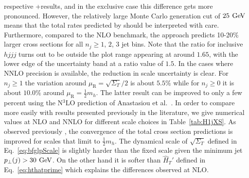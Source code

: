 respective \hjetscompGoSam{}+\hjetscompSherpa results, and in the exclusive case this
difference gets more pronounced. However, the relatively large Monte
Carlo generation cut of $25\,\text{\:GeV}$ means that the total rates predicted
by \hjetscompLoopsim should be interpreted with care.
Furthermore, compared to the NLO benchmark, the \hjetscompMinlo approach
predicts 10-20\% larger cross sections for all $n_j\ge 1$, $2$, $3$ jet bins.
Note that the \hjetscompMinlo ratio for inclusive $hjjj$ turns out to be
outside the plot range appearing at around $1.65$, with the lower edge
of the uncertainty band at a ratio value of $1.5$.
In the cases where NNLO precision is available, the reduction in scale
uncertainty is clear. For $n_j\ge1$ the variation around
$\mu_\mathrm{R}=\sqrt{\Sigma_T}/2$ is about $5.5\%$ while for
$n_j\ge0$ it is about $10.0\%$ around $\mu_\mathrm{R}=\tfrac{1}{2}m_h$.
The latter result can be improved to only a few percent using the
N${}^3$LO prediction of Anastasiou et al.~\cite{Anastasiou:2015ema}.
In order to compare more easily with results presented previously in
the literature, we give numerical values at NLO and NNLO for different
scale choices in Table~\ref{tab:H1jXS}. As observed previously
\cite{Boughezal:2015dra}, the convergence of the total cross section predictions
is improved for scales that limit to $\tfrac{1}{2}m_h$. The dynamical
scale of $\sqrt{\Sigma_T}$ defined in Eq.~\eqref{eq:bfglpScale} is
slightly harder than the fixed scale given the minimum jet
$p_\perp(j)>30\,\text{\:GeV}$. On the other hand it is softer than $\hat{H}_T'$
defined in Eq.~\eqref{eq:hthatprime} which explains the differences observed at
NLO.




